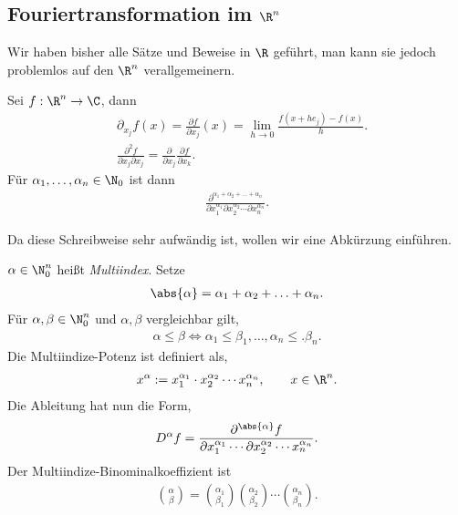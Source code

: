 \subsection{Fouriertransformation im $\R^n$}
Wir haben bisher alle Sätze und Beweise in $\R$ geführt, man kann sie jedoch 
problemlos auf den $\R^n$ verallgemeinern.

\begin{bemn}[Erinnerung.]
Sei $f:\R^n\to\C$, dann
\begin{align*}
&\partial_{x_j}f(x) = \frac{\partial f}{\partial x_j}(x) = \lim\limits_{h\to 0}
\frac{f(x+he_j)-f(x)}{h}.\\
&\frac{\partial^2f}{\partial x_j \partial x_j} = \frac{\partial }{\partial
x_j}\frac{\partial f}{\partial x_k}.
\end{align*}
Für $\alpha_1,\ldots,\alpha_n\in\N_0$ ist dann
\begin{align*}
\frac{\partial^{\alpha_1+\alpha_2+\ldots+\alpha_n}}{\partial
x_1^{\alpha_1}\partial x_2^{\alpha_2}\cdots \partial x_n^{\alpha_n}}.
\end{align*}
\end{bemn}
Da diese Schreibweise sehr aufwändig ist, wollen wir eine Abkürzung einführen.
\begin{defn}
\label{defn:2.34}
$\alpha\in\N_0^n$ heißt \emph{Multiindex}. Setze
\begin{align*}
\abs{\alpha} = \alpha_1 + \alpha_2 + \ldots + \alpha_n.
\end{align*}
Für $\alpha,\beta\in\N_0^n$ und $\alpha,\beta$ vergleichbar gilt,
\begin{align*}
\alpha\le \beta \Leftrightarrow \alpha_1\le \beta_1, \ldots, \alpha_n\le.
\beta_n.
\end{align*}
Die Multiindize-Potenz ist definiert als,
\begin{align*}
x^\alpha := x_1^{\alpha_1} \cdot x_2^{\alpha_2} \cdots x_n^{\alpha_n},\qquad
x\in\R^n.
\end{align*}
Die Ableitung hat nun die Form,
\begin{align*}
D^\alpha f = \frac{\partial^{\abs{\alpha}}f}{\partial x_1^{\alpha_1}\cdots
\partial x_2^{\alpha_2}\cdots x_n^{\alpha_n}}.
\end{align*}
Der Multiindize-Binominalkoeffizient ist
\begin{align*}
\binom{\alpha}{\beta} =
\binom{\alpha_1}{\beta_1}\binom{\alpha_2}{\beta_2}\cdots
\binom{\alpha_n}{\beta_n}.
\end{align*}
\end{defn}

